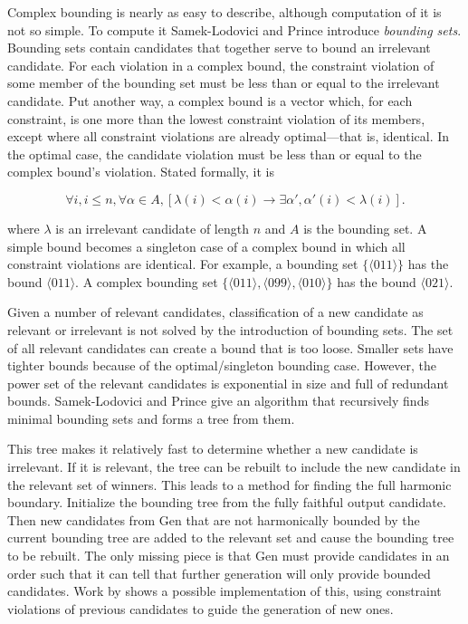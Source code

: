\documentclass[11pt]{article}
\begin{document}
Complex bounding is nearly as easy to describe, although computation
of it is not so simple. To compute it Samek-Lodovici and Prince
introduce {\it bounding sets}. Bounding sets contain
candidates that together serve to bound an irrelevant candidate.  For each violation in a
complex bound, the constraint violation of some member of the bounding
set must be less than or equal to the irrelevant candidate. Put
another way, a complex bound is a vector which, for each constraint, is
one more than the lowest constraint violation of its members, except
where all constraint violations are already optimal---that is,
identical. In the optimal case, the candidate violation must be less than
or equal to the complex bound's violation. Stated formally, it is

\begin{equation}
  \forall i, i \leq n, \forall \alpha \in A, [\lambda(i)<\alpha(i) \to \exists
  \alpha', \alpha'(i) < \lambda(i) ].
\end{equation}

where $\lambda$ is an irrelevant candidate of length $n$ and $A$ is
the bounding set. A simple bound becomes a singleton case of a complex
bound in which all constraint violations are identical.
For example, a bounding set $\{\langle0 1
1\rangle\}$ has the bound $\langle 0 1 1\rangle$. A complex bounding
set $\{\langle0 1 1\rangle, \langle 0 9 9 \rangle, \langle 0 1 0
\rangle\}$ has the bound $\langle0 2 1\rangle$.

Given a number of relevant candidates, classification of a new
candidate as relevant or irrelevant is not solved by the introduction
of bounding sets. The set of all relevant candidates can create a
bound that is too loose. Smaller sets have tighter bounds because of
the optimal/singleton bounding case. However, the power set of the
relevant candidates is exponential in size and full of redundant
bounds. Samek-Lodovici and Prince give an algorithm that recursively
finds minimal bounding sets and forms a tree from them.

This tree makes it relatively fast to determine whether a new
candidate is irrelevant. If it is relevant, the tree can be rebuilt to
include the new candidate in the relevant set of winners. This leads
to a method for finding the full harmonic boundary. Initialize the
bounding tree from the fully faithful output candidate.  Then new
candidates from {\sc Gen} that are not harmonically bounded by the
current bounding tree are added to the relevant set and cause the
bounding tree to be rebuilt. The only missing piece is that {\sc Gen}
must provide candidates in an order such that it can tell that further
generation will only provide bounded candidates. Work by
 shows a possible implementation of this, using
constraint violations of previous candidates to guide the generation
of new ones.
\end{document}
